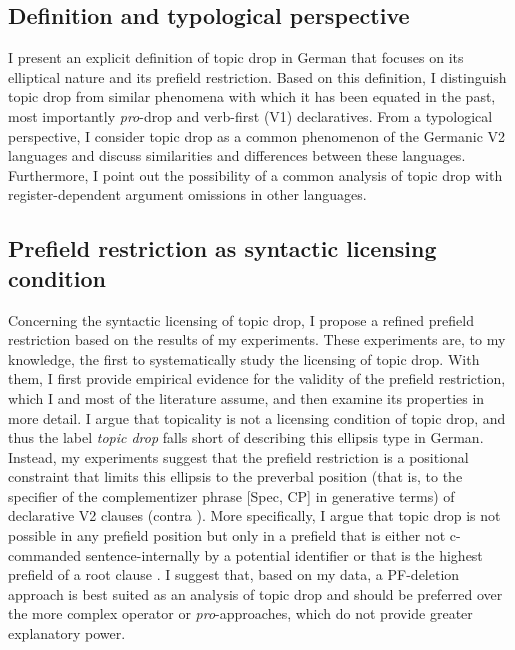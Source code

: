 \subsection{Definition and typological perspective}
I present an explicit definition of topic drop in German that focuses on its elliptical nature and its prefield restriction.
Based on this definition, I distinguish topic drop from similar phenomena with which it has been equated in the past, most importantly \textit{pro}-drop  and verb-first (V1) declaratives. 
From a typological perspective, I consider topic drop as a common phenomenon of the Germanic V2 languages  and discuss similarities and differences between these languages.
Furthermore, I point out the possibility of a common analysis of topic drop with register-dependent argument omissions in other languages.

\subsection{Prefield restriction as syntactic licensing condition}
Concerning the syntactic licensing of topic drop, I propose a refined prefield restriction based on the results of my experiments.
These experiments are, to my knowledge, the first to systematically study the licensing of topic drop.
With them, I first provide empirical evidence for the validity of the prefield restriction, which I and most of the literature assume, and then examine its properties in more detail.
I argue that topicality is not a licensing condition of topic drop, and thus the label \textit{topic drop} falls short of describing this ellipsis type in German.
Instead, my experiments suggest that the prefield restriction is a positional constraint that limits this ellipsis to the preverbal position (that is, to the specifier of the complementizer phrase  [Spec, CP] in generative terms) of declarative V2 clauses (contra \cite{helmer2016}).
More specifically, I argue that topic drop is not possible in any prefield position but only in a prefield that is either not c-commanded  sentence-internally by a potential identifier \citep{rizzi1994} or that is the highest prefield of a root clause \citep{freywald2020}.
I suggest that, based on my data, a PF-deletion approach is best suited as an analysis of topic drop and should be preferred over the more complex operator or \textit{pro}-approaches, which do not provide greater explanatory power.

